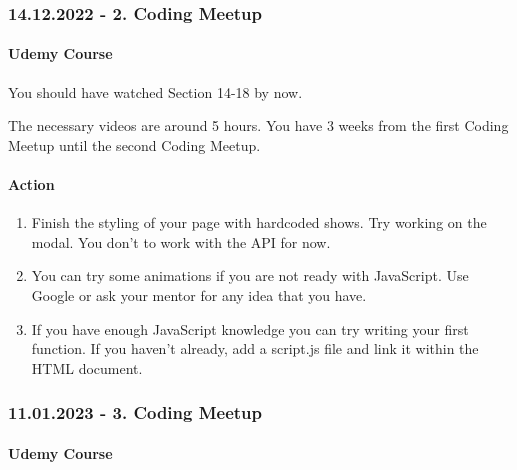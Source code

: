 \documentclass[
]{article}
\providecommand{\tightlist}{%
  \setlength{\itemsep}{0pt}\setlength{\parskip}{0pt}}
\begin{document}
\hypertarget{coding-meetup-1}{%
\subsubsection*{14.12.2022 - 2. Coding Meetup}\label{coding-meetup-1}}

\hypertarget{udemy-course-2}{%
\paragraph*{Udemy Course}\label{udemy-course-2}}

You should have watched Section 14-18 by now.

The necessary videos are around 5 hours. You have 3 weeks from the first Coding Meetup until the second Coding Meetup.

\hypertarget{action-1}{%
\paragraph*{Action}\label{action-1}}

\begin{enumerate}
\def\labelenumi{\arabic{enumi}.}
\tightlist
\item
  Finish the styling of your page with hardcoded shows. Try working on the modal. You don't to work with the API for now.
\item
  You can try some animations if you are not ready with JavaScript. Use Google or ask your mentor for any idea that you have.
\item
  If you have enough JavaScript knowledge you can try writing your first function. If you haven't already, add a script.js file and link it within the HTML document.
\end{enumerate}

\hypertarget{coding-meetup-2}{%
\subsubsection*{11.01.2023 - 3. Coding Meetup}\label{coding-meetup-2}}

\hypertarget{udemy-course-3}{%
\paragraph*{Udemy Course}\label{udemy-course-3}}
\end{document}
